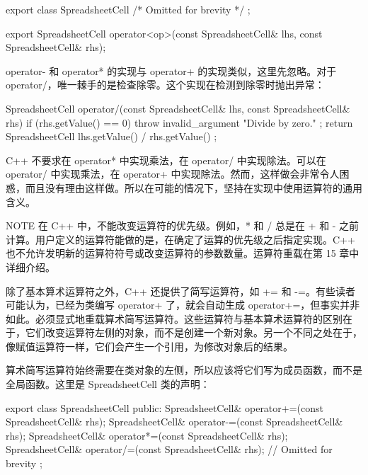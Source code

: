 \begin{cpp}
export class SpreadsheetCell { /* Omitted for brevity */ };

export SpreadsheetCell operator<op>(const SpreadsheetCell& lhs,
    const SpreadsheetCell& rhs);
\end{cpp}

operator- 和 operator* 的实现与 operator+ 的实现类似，这里先忽略。对于 operator/，唯一棘手的是检查除零。这个实现在检测到除零时抛出异常：

\begin{cpp}
SpreadsheetCell operator/(const SpreadsheetCell& lhs,
    const SpreadsheetCell& rhs)
{
    if (rhs.getValue() == 0) {
        throw invalid_argument { "Divide by zero." };
    }
    return SpreadsheetCell { lhs.getValue() / rhs.getValue() };
}
\end{cpp}

C++ 不要求在 operator* 中实现乘法，在 operator/ 中实现除法。可以在 operator/ 中实现乘法，在 operator+ 中实现除法。然而，这样做会非常令人困惑，而且没有理由这样做。所以在可能的情况下，坚持在实现中使用运算符的通用含义。

\begin{myNotic}{NOTE}
在 C++ 中，不能改变运算符的优先级。例如，* 和 / 总是在 + 和 - 之前计算。用户定义的运算符能做的是，在确定了运算的优先级之后指定实现。C++ 也不允许发明新的运算符符号或改变运算符的参数数量。运算符重载在第 15 章中详细介绍。
\end{myNotic}


除了基本算术运算符之外，C++ 还提供了简写运算符，如 += 和 -=。有些读者可能认为，已经为类编写 operator+ 了，就会自动生成 operator+=，但事实并非如此。必须显式地重载算术简写运算符。这些运算符与基本算术运算符的区别在于，它们改变运算符左侧的对象，而不是创建一个新对象。另一个不同之处在于，像赋值运算符一样，它们会产生一个引用，为修改对象后的结果。

算术简写运算符始终需要在类对象的左侧，所以应该将它们写为成员函数，而不是全局函数。这里是 SpreadsheetCell 类的声明：

\begin{cpp}
export class SpreadsheetCell
{
    public:
        SpreadsheetCell& operator+=(const SpreadsheetCell& rhs);
        SpreadsheetCell& operator-=(const SpreadsheetCell& rhs);
        SpreadsheetCell& operator*=(const SpreadsheetCell& rhs);
        SpreadsheetCell& operator/=(const SpreadsheetCell& rhs);
        // Omitted for brevity
};
\end{cpp}


